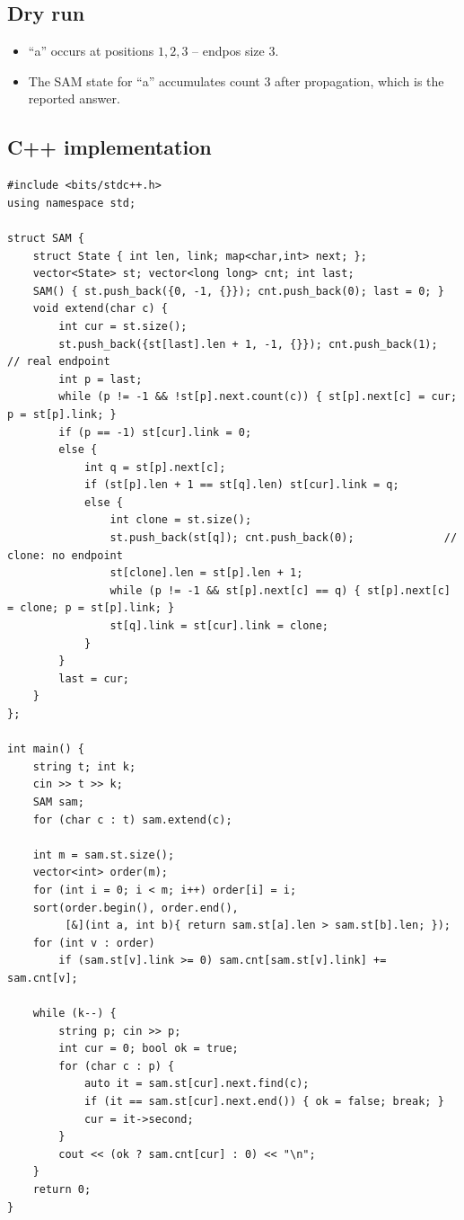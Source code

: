 \subsection*{Dry run}


\begin{itemize}
  \item ``a'' occurs at positions $1,2,3$ -- endpos size $3$.
  \item The SAM state for ``a'' accumulates count $3$ after propagation,
        which is the reported answer.
\end{itemize}

\subsection*{C++ implementation}

\begin{lstlisting}
#include <bits/stdc++.h>
using namespace std;

struct SAM {
    struct State { int len, link; map<char,int> next; };
    vector<State> st; vector<long long> cnt; int last;
    SAM() { st.push_back({0, -1, {}}); cnt.push_back(0); last = 0; }
    void extend(char c) {
        int cur = st.size();
        st.push_back({st[last].len + 1, -1, {}}); cnt.push_back(1);  // real endpoint
        int p = last;
        while (p != -1 && !st[p].next.count(c)) { st[p].next[c] = cur; p = st[p].link; }
        if (p == -1) st[cur].link = 0;
        else {
            int q = st[p].next[c];
            if (st[p].len + 1 == st[q].len) st[cur].link = q;
            else {
                int clone = st.size();
                st.push_back(st[q]); cnt.push_back(0);              // clone: no endpoint
                st[clone].len = st[p].len + 1;
                while (p != -1 && st[p].next[c] == q) { st[p].next[c] = clone; p = st[p].link; }
                st[q].link = st[cur].link = clone;
            }
        }
        last = cur;
    }
};

int main() {
    string t; int k;
    cin >> t >> k;
    SAM sam;
    for (char c : t) sam.extend(c);

    int m = sam.st.size();
    vector<int> order(m);
    for (int i = 0; i < m; i++) order[i] = i;
    sort(order.begin(), order.end(),
         [&](int a, int b){ return sam.st[a].len > sam.st[b].len; });
    for (int v : order)
        if (sam.st[v].link >= 0) sam.cnt[sam.st[v].link] += sam.cnt[v];

    while (k--) {
        string p; cin >> p;
        int cur = 0; bool ok = true;
        for (char c : p) {
            auto it = sam.st[cur].next.find(c);
            if (it == sam.st[cur].next.end()) { ok = false; break; }
            cur = it->second;
        }
        cout << (ok ? sam.cnt[cur] : 0) << "\n";
    }
    return 0;
}
\end{lstlisting}

